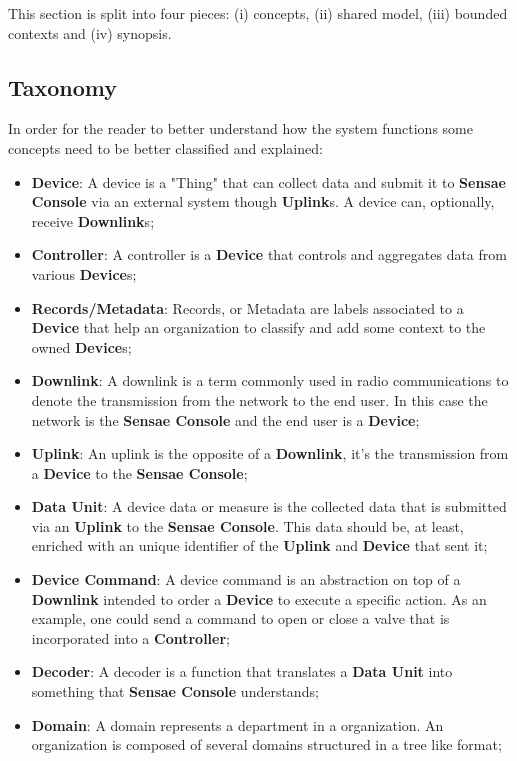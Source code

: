 This section is split into four pieces: (i) concepts, (ii) shared model, (iii) bounded contexts and (iv) synopsis.

\subsection{Taxonomy}
\label{subsec:design:domain:taxonomy}

In order for the reader to better understand how the system functions some concepts need to be better classified and explained:

\begin{itemize}
   \item \textbf{Device}: A device is a "Thing" that can collect data and submit it to \textbf{Sensae Console} via an external system though \textbf{Uplink}s. A device can, optionally, receive \textbf{Downlink}s;
   \item \textbf{Controller}: A controller is a \textbf{Device} that controls and aggregates data from various \textbf{Device}s;
   \item \textbf{Records/Metadata}: Records, or Metadata are labels associated to a \textbf{Device} that help an organization to classify and add some context to the owned \textbf{Device}s;
   \item \textbf{Downlink}: A downlink is a term commonly used in radio communications to denote the transmission from the network to the end user. In this case the network is the \textbf{Sensae Console} and the end user is a \textbf{Device};
   \item \textbf{Uplink}: An uplink is the opposite of a \textbf{Downlink}, it's the transmission from a \textbf{Device} to the \textbf{Sensae Console};
   \item \textbf{Data Unit}: A device data or measure is the collected data that is submitted via an \textbf{Uplink} to the \textbf{Sensae Console}. This data should be, at least, enriched with an unique identifier of the \textbf{Uplink} and \textbf{Device} that sent it;
   \item \textbf{Device Command}: A device command is an abstraction on top of a \textbf{Downlink} intended to order a \textbf{Device} to execute a specific action. As an example, one could send a command to open or close a valve that is incorporated into a \textbf{Controller};
   \item \textbf{Decoder}: A decoder is a function that translates a \textbf{Data Unit} into something that \textbf{Sensae Console} understands;
   \item \textbf{Domain}: A domain represents a department in a organization. An organization is composed of several domains structured in a tree like format;

\end{itemize}
